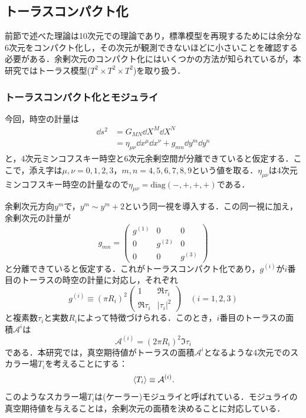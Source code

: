 \documentclass[a4paper,uplatex,dvipdfmx,10pt]{jsarticle}
\theoremstyle{definition}
\begin{document}
\subsection{トーラスコンパクト化}

前節で述べた理論は10次元での理論であり，標準模型を再現するためには余分な6次元をコンパクト化し，その次元が観測できないほどに小さいことを確認する必要がある．余剰次元のコンパクト化にはいくつかの方法が知られているが，本研究ではトーラス模型($T^{2}\times T^{2}\times T^{2}$)を取り扱う．

\subsubsection{トーラスコンパクト化とモジュライ}

今回，時空の計量は
\begin{align}
   \dd s^2
   &=
   G_{MN}\dd X^{M}\dd X^{N}
   \nonumber
   \\
   &=
   \eta_{\mu\nu}\dd x^{\mu}\dd x^{\nu}
   +
   g_{mn}\dd y^{m}\dd y^{n}
   \nonumber
\end{align}
と，4次元ミンコフスキー時空と6次元余剰空間が分離できていると仮定する．ここで，添え字は$\mu,\nu=0,1,2,3$，$m,n=4,5,6,7,8,9$という値を取る．$\eta_{\mu\nu}$は4次元ミンコフスキー時空の計量なので$\eta_{\mu\nu}=\text{diag}(-,+,+,+)$である．

余剰次元方向$y^{m}$で，$y^{m}\sim y^{m}+2$という同一視を導入する．この同一視に加え，余剰次元の計量が
\begin{equation}
   g_{mn}
   =
   \begin{pmatrix}
      g^{(1)} & 0 & 0 \\
      0 & g^{(2)} & 0 \\
      0 & 0 & g^{(3)} 
   \end{pmatrix}
   \nonumber
\end{equation}
と分離できていると仮定する．これがトーラスコンパクト化であり，$g^{(i)}$が$i$番目のトーラスの時空の計量に対応し，それぞれ
\begin{equation}
   g^{(i)}
   \equiv
   (\pi R_{i})^2
   \begin{pmatrix}
      1 & \Re\tau_{i} \\
      \Re\tau_{i} & |\tau_{i}|^2
   \end{pmatrix}
   \quad
   (i=1,2,3)
   \nonumber
\end{equation}
と複素数$\tau_{i}$と実数$R_{i}$によって特徴づけられる．このとき，$i$番目のトーラスの面積$\mathcal{A}^{i}$は
\begin{equation}
   \mathcal{A}^{(i)}
   =
   (2\pi R_{i})^2\Im\tau_{i}
   \label{are_torus}
\end{equation}
である．本研究では，真空期待値がトーラスの面積$\mathcal{A}^{i}$となるような4次元でのスカラー場$T_{i}$を考えることにする：
\begin{equation}
   \ev*{T_{i}}
   \equiv
   \mathcal{A}^{(i)}
   .
   \label{def_moduli}
\end{equation}
このようなスカラー場$T_{i}$は(ケーラー)モジュライと呼ばれている．モジュライの真空期待値を与えることは，余剰次元の面積を決めることに対応している．
\end{document}
